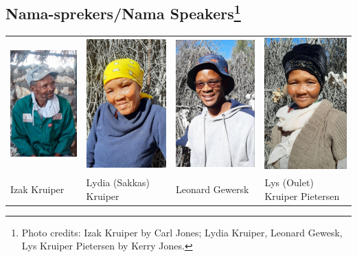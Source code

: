 \markboth{}{}
\subsection*{Nama-sprekers/Nama Speakers\footnote{Photo credits: Izak
Kruiper by Carl Jones; Lydia Kruiper, Leonard Gewesk, Lys Kruiper
Pietersen by Kerry Jones.}}
\markboth{}{}

\begin{tabular}{llll}
    \includegraphics[width=.2\textwidth]{isak_s.jpg} &
    \includegraphics[width=.2\textwidth]{lydia_s.jpg} &
    \includegraphics[width=.2\textwidth]{leonard_s.jpg} &
    \includegraphics[width=.2\textwidth]{lys_s.jpg} \\
    Izak Kruiper & Lydia (Sakkas) Kruiper & Leonard Gewersk & Lys
    (Oulet) Kruiper Pietersen \\
\end{tabular}


